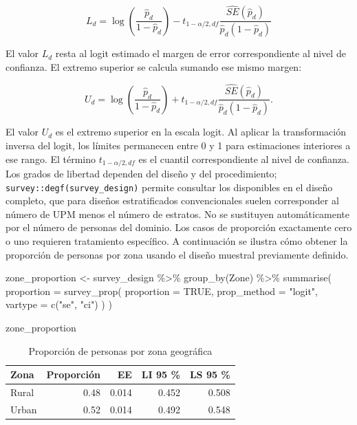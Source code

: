 \documentclass[
  spanish,
  11pt,
  letterpaper,
  oneside,
  open=any]{scrbook}
\newenvironment{Shaded}{\begin{snugshade}}{\end{snugshade}}
\newcommand{\AttributeTok}[1]{\textcolor[rgb]{0.40,0.45,0.13}{#1}}
\newcommand{\ConstantTok}[1]{\textcolor[rgb]{0.56,0.35,0.01}{#1}}
\newcommand{\FunctionTok}[1]{\textcolor[rgb]{0.28,0.35,0.67}{#1}}
\newcommand{\NormalTok}[1]{\textcolor[rgb]{0.00,0.23,0.31}{#1}}
\newcommand{\OtherTok}[1]{\textcolor[rgb]{0.00,0.23,0.31}{#1}}
\newcommand{\SpecialCharTok}[1]{\textcolor[rgb]{0.37,0.37,0.37}{#1}}
\newcommand{\StringTok}[1]{\textcolor[rgb]{0.13,0.47,0.30}{#1}}
\begin{document}
\[
L_d
=
\log\left(\frac{\hat{p}_d}{1-\hat{p}_d}\right)
-
t_{1-\alpha/2, df}
\frac{\widehat{SE}(\hat{p}_d)}
{\hat{p}_d(1-\hat{p}_d)}
\]

El valor \(L_d\) resta al logit estimado el margen de error
correspondiente al nivel de confianza. El extremo superior se calcula
sumando ese mismo margen:

\[
U_d
=
\log\left(\frac{\hat{p}_d}{1-\hat{p}_d}\right)
+
t_{1-\alpha/2, df}
\frac{\widehat{SE}(\hat{p}_d)}
{\hat{p}_d(1-\hat{p}_d)}.
\]

El valor \(U_d\) es el extremo superior en la escala logit. Al aplicar
la transformación inversa del logit, los límites permanecen entre 0 y 1
para estimaciones interiores a ese rango. El término
\(t_{1-\alpha/2,df}\) es el cuantil correspondiente al nivel de
confianza. Los grados de libertad dependen del diseño y del
procedimiento; \texttt{survey::degf(survey\_design)} permite consultar
los disponibles en el diseño completo, que para diseños estratificados
convencionales suelen corresponder al número de UPM menos el número de
estratos. No se sustituyen automáticamente por el número de personas del
dominio. Los casos de proporción exactamente cero o uno requieren
tratamiento específico. A continuación se ilustra cómo obtener la
proporción de personas por zona usando el diseño muestral previamente
definido.

\begin{Shaded}
\begin{Highlighting}[]
\NormalTok{zone\_proportion }\OtherTok{\textless{}{-}}\NormalTok{ survey\_design }\SpecialCharTok{\%\textgreater{}\%}
  \FunctionTok{group\_by}\NormalTok{(Zone) }\SpecialCharTok{\%\textgreater{}\%}
  \FunctionTok{summarise}\NormalTok{(}
    \AttributeTok{proportion =} \FunctionTok{survey\_prop}\NormalTok{(}
      \AttributeTok{proportion =} \ConstantTok{TRUE}\NormalTok{,}
      \AttributeTok{prop\_method =} \StringTok{"logit"}\NormalTok{,}
      \AttributeTok{vartype =} \FunctionTok{c}\NormalTok{(}\StringTok{"se"}\NormalTok{, }\StringTok{"ci"}\NormalTok{)}
\NormalTok{    )}
\NormalTok{  )}

\NormalTok{zone\_proportion}
\end{Highlighting}
\end{Shaded}

{

\begin{longtable}[]{@{}lrrrr@{}}

\caption{\label{tbl-prop-zona}Proporción de personas por zona
geográfica}

\tabularnewline

\toprule\noalign{}
Zona & Proporción & EE & LI 95 \% & LS 95 \% \\
\midrule\noalign{}
\endhead
\bottomrule\noalign{}
\endlastfoot
Rural & 0.48 & 0.014 & 0.452 & 0.508 \\
Urban & 0.52 & 0.014 & 0.492 & 0.548 \\

\end{longtable}

}
\end{document}
